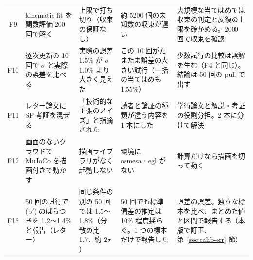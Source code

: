 \documentclass[paper=a4paper,fontsize=10pt,twocolumn,column_gap=2zw,line_length=24zw,number_of_lines=46,head_space=20mm]{jlreq}
\begin{document}
\begin{table}[t]
\begin{tabular}{cp{}p{}p{}p{}}
F9 & kinematic fit を関数評価 200 回で解く & 上限で打ち切り（収束の保証なし） & 約 5200 個の未知数の収束が遅い & 大規模な当てはめでは収束の判定と反復の上限を確かめる。2000 回で収束を確認 \\
F10 & 逐次更新の 10 回で $\sigma$ と実際の誤差を比べる & 実際の誤差 1.5\% が $\sigma$ 1.0\% より大きく見えた & この 10 回がたまたま誤差の大きい試行（一括の当てはめも 1.55\%） & 少数試行の比較は誤解を生む（F4 と同じ）。結論は 50 回の pull で出す \\
F11 & レター論文に SF 考証を混ぜる & 「技術的な主張のノイズ」と指摘された & 読者と論証の種類が違う内容を 1 本にした & 学術論文と解説・考証の役割分担。2 本に分けて解決 \\
F12 & 画面のないクラウドで MuJoCo を描画付きで動かす & 描画ライブラリがなく起動しない & 環境に osmesa・egl がない & 計算だけなら描画を切って動く \\
F13 & 50 回の試行で (b$'$) のばらつきを 1.2〜1.4\% と報告（レター） & 同じ条件の別の 50 回では 1.5〜1.8\%（分散の比 1.7、約 2$\sigma$） & 50 回でも標準偏差の推定は 10\% 程度揺らぐ。1 つの標本だけで報告した & 誤差の誤差。独立な標本を比べ、まとめた値と区間で報告する（本版で訂正、第~\ref{sec:calib-err} 節） \\\bottomrule
\end{tabular}
\end{table}
\end{document}
